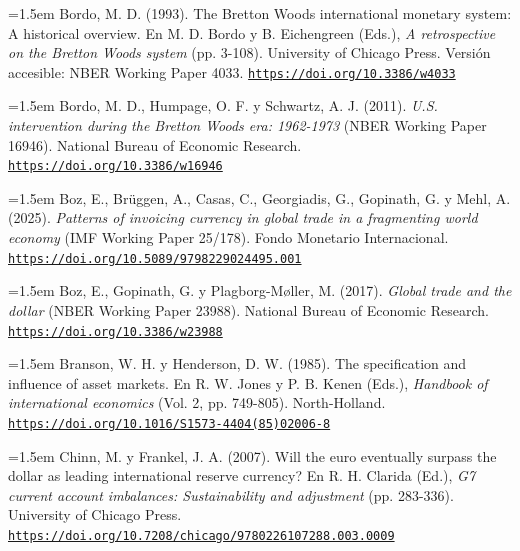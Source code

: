 \documentclass[10pt,a4paper]{article}
\begin{document}
{\sloppy\noindent\hangindent=1.5em Bordo, M. D. (1993). The Bretton Woods international monetary system: A historical overview. En M. D. Bordo y B. Eichengreen (Eds.), \textit{A retrospective on the Bretton Woods system} (pp. 3-108). University of Chicago Press. Versión accesible: NBER Working Paper 4033. \href{https://doi.org/10.3386/w4033}{\nolinkurl{https://doi.org/10.3386/w4033}}\par}

{\sloppy\noindent\hangindent=1.5em Bordo, M. D., Humpage, O. F. y Schwartz, A. J. (2011). \textit{U.S. intervention during the Bretton Woods era: 1962-1973} (NBER Working Paper 16946). National Bureau of Economic Research. \href{https://doi.org/10.3386/w16946}{\nolinkurl{https://doi.org/10.3386/w16946}}\par}

{\sloppy\noindent\hangindent=1.5em Boz, E., Brüggen, A., Casas, C., Georgiadis, G., Gopinath, G. y Mehl, A. (2025). \textit{Patterns of invoicing currency in global trade in a fragmenting world economy} (IMF Working Paper 25/178). Fondo Monetario Internacional. \href{https://doi.org/10.5089/9798229024495.001}{\nolinkurl{https://doi.org/10.5089/9798229024495.001}}\par}

{\sloppy\noindent\hangindent=1.5em Boz, E., Gopinath, G. y Plagborg-Møller, M. (2017). \textit{Global trade and the dollar} (NBER Working Paper 23988). National Bureau of Economic Research. \href{https://doi.org/10.3386/w23988}{\nolinkurl{https://doi.org/10.3386/w23988}}\par}

{\sloppy\noindent\hangindent=1.5em Branson, W. H. y Henderson, D. W. (1985). The specification and influence of asset markets. En R. W. Jones y P. B. Kenen (Eds.), \textit{Handbook of international economics} (Vol. 2, pp. 749-805). North-Holland. \href{https://doi.org/10.1016/S1573-4404(85)02006-8}{\nolinkurl{https://doi.org/10.1016/S1573-4404(85)02006-8}}\par}

{\sloppy\noindent\hangindent=1.5em Chinn, M. y Frankel, J. A. (2007). Will the euro eventually surpass the dollar as leading international reserve currency? En R. H. Clarida (Ed.), \textit{G7 current account imbalances: Sustainability and adjustment} (pp. 283-336). University of Chicago Press. \href{https://doi.org/10.7208/chicago/9780226107288.003.0009}{\nolinkurl{https://doi.org/10.7208/chicago/9780226107288.003.0009}}\par}
\end{document}
